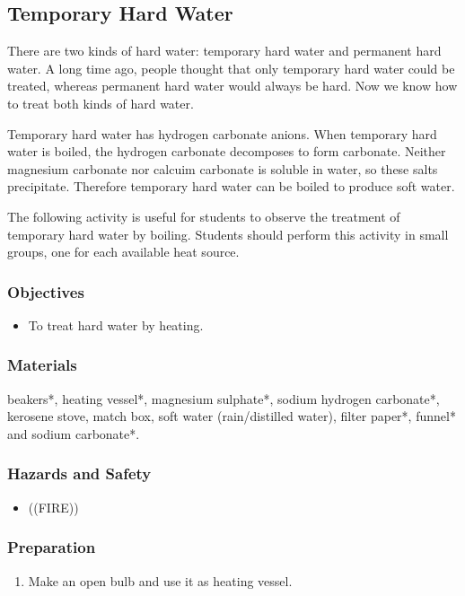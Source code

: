 \subsection{Temporary Hard Water}

There are two kinds of hard water: temporary hard water and permanent hard water. A long time ago, people thought that only temporary hard water could be treated, whereas permanent hard water would always be hard. Now we know how to treat both kinds of hard water.

Temporary hard water has hydrogen carbonate anions. When temporary hard water is boiled, the hydrogen carbonate decomposes to form carbonate. Neither magnesium carbonate nor calcuim carbonate is soluble in water, so these salts precipitate. Therefore temporary hard water can be boiled to produce soft water.

The following activity is useful for students to observe the treatment of temporary hard water by boiling. Students should perform this activity in small groups, one for each available heat source.

\subsubsection*{Objectives}
\begin{itemize}
\item{To treat hard water by heating.}
\end{itemize}

\subsubsection*{Materials}
beakers*, heating vessel*, magnesium sulphate*, sodium hydrogen carbonate*, kerosene stove, match box, soft water (rain/distilled water), filter paper*, funnel* and sodium carbonate*.

\subsubsection*{Hazards and Safety}
\begin{itemize}
\item{((FIRE))}
\end{itemize}

\subsubsection*{Preparation}
\begin{enumerate}
\item{Make an open bulb and use it as heating vessel.}
\end{enumerate}

